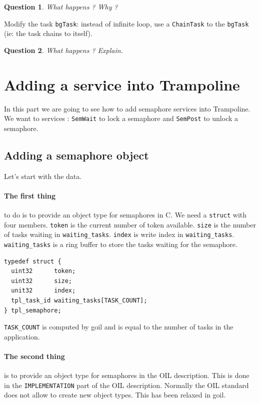 \documentclass[11pt]{article}
\newtheorem{ex}{Question}
\begin{document}
\begin{ex}
What happens ? Why ?
\end{ex}

Modify the task \texttt{bgTask}: instead of infinite loop, use a \texttt{ChainTask} to the \texttt{bgTask} (ie: the task chains to itself).

\begin{ex}
What happens ? Explain.
\end{ex}

\section{Adding a service into Trampoline}

In this part we are going to see how to add semaphore services into Trampoline. We want to services : \lstinline{SemWait} to lock a semaphore and \lstinline{SemPost} to unlock a semaphore.

\subsection{Adding a semaphore object}

Let's start with the data. 

\paragraph{The first thing} to do is to provide an object type for semaphores in C. We need a \lstinline{struct} with four members. \lstinline{token} is the current number of token available. \lstinline{size} is the number of tasks waiting in \lstinline{waiting_tasks}. \lstinline{index} is write index in \lstinline{waiting_tasks}. \lstinline{waiting_tasks} is a ring buffer to store the tasks waiting for the semaphore.

\begin{lstlisting}
typedef struct {
  uint32      token;
  uint32      size;
  unit32      index;
  tpl_task_id waiting_tasks[TASK_COUNT];
} tpl_semaphore;
\end{lstlisting}

\lstinline{TASK_COUNT} is computed by goil and is equal to the number of tasks in the application. 

\paragraph{The second thing} is to provide an object type for semaphores in the OIL description. This is done in the \lstinline{IMPLEMENTATION} part of the OIL description. Normally the OIL standard does not allow to create new object types. This has been relaxed in goil.
\end{document}
